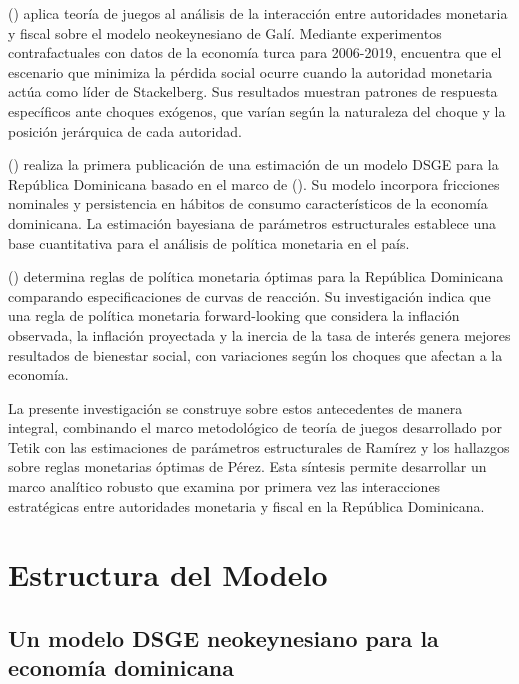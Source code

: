 \documentclass[
  man,
  longtable,
  nolmodern,
  notxfonts,
  notimes,
  colorlinks=true,linkcolor=blue,citecolor=blue,urlcolor=blue]{apa7}
\begin{document}
() aplica
teoría de juegos al análisis de la interacción entre autoridades
monetaria y fiscal sobre el modelo neokeynesiano de Galí. Mediante
experimentos contrafactuales con datos de la economía turca para
2006-2019, encuentra que el escenario que minimiza la pérdida social
ocurre cuando la autoridad monetaria actúa como líder de Stackelberg.
Sus resultados muestran patrones de respuesta específicos ante choques
exógenos, que varían según la naturaleza del choque y la posición
jerárquica de cada autoridad.

() realiza la
primera publicación de una estimación de un modelo DSGE para la
República Dominicana basado en el marco de
(). Su modelo
incorpora fricciones nominales y persistencia en hábitos de consumo
característicos de la economía dominicana. La estimación bayesiana de
parámetros estructurales establece una base cuantitativa para el
análisis de política monetaria en el país.

() determina
reglas de política monetaria óptimas para la República Dominicana
comparando especificaciones de curvas de reacción. Su investigación
indica que una regla de política monetaria forward-looking que considera
la inflación observada, la inflación proyectada y la inercia de la tasa
de interés genera mejores resultados de bienestar social, con
variaciones según los choques que afectan a la economía.

La presente investigación se construye sobre estos antecedentes de
manera integral, combinando el marco metodológico de teoría de juegos
desarrollado por Tetik con las estimaciones de parámetros estructurales
de Ramírez y los hallazgos sobre reglas monetarias óptimas de Pérez.
Esta síntesis permite desarrollar un marco analítico robusto que examina
por primera vez las interacciones estratégicas entre autoridades
monetaria y fiscal en la República Dominicana.

\newpage{}

\section{Estructura del Modelo}\label{estructura-del-modelo}

\subsection{Un modelo DSGE neokeynesiano para la economía
dominicana}\label{un-modelo-dsge-neokeynesiano-para-la-economuxeda-dominicana}
\end{document}
